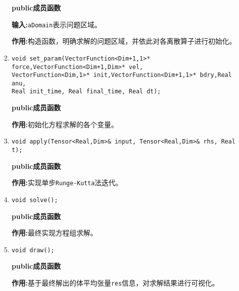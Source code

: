 \documentclass[UTF8]{ctexart}
\theoremstyle{plain}
\theoremstyle{definition}
\theoremstyle{remark}
\begin{document}
\begin{itemize}
\begin{enumerate}
        \textbf{public成员函数}

        \textbf{输入:}\texttt{aDomain}表示问题区域。

        \textbf{作用:}构造函数，明确求解的问题区域，并依此对各离散算子进行初始化。

        \item \texttt{void set\_param(VectorFunction<Dim+1,1>* force,VectorFunction<Dim+1,Dim>* vel,\\VectorFunction<Dim,1>* init,VectorFunction<Dim+1,1>* bdry,Real anu,\\Real init\_time, Real final\_time, Real dt);}
        
        \textbf{public成员函数}

        \textbf{作用:}初始化方程求解的各个变量。

        \item \texttt{void apply(Tensor<Real,Dim>\& input, Tensor<Real,Dim>\& rhs, Real t);}

        \textbf{public成员函数}

        \textbf{作用:}实现单步\texttt{Runge-Kutta}法迭代。

        \item \texttt{void solve();}

        \textbf{public成员函数}

        \textbf{作用:}最终实现方程组求解。

        \item \texttt{void draw();}
        
        \textbf{public成员函数}

        \textbf{作用:}基于最终解出的体平均张量\texttt{res}信息，对求解结果进行可视化。

    \end{enumerate}
\end{itemize}
\end{document}
